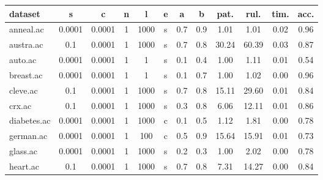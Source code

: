 \begin{table}[htbp]
	\centering
		\begin{tabular}{|l|c|c|c|c|c|c|c||c|c|c|c|}
		\hline
		\textbf{dataset}	& \textbf{s}	& \textbf{c}	& \textbf{n}	& \textbf{l}	& \textbf{e} & \textbf{a} & \textbf{b} & \textbf{pat.}	& \textbf{rul.}	& \textbf{tim.}	& \textbf{acc.}	\\
		\hline
		anneal.ac      & 0.0001   & 0.0001      & 1              & 1000                & s        & 0.7    & 0.9   & 1.01           & 1.01           & 0.02           & 0.96           \\
		\hline
		austra.ac      & 0.1      & 0.0001      & 1              & 1000                & s        & 0.7    & 0.8   & 30.24          & 60.39          & 0.03           & 0.87           \\
		\hline
		auto.ac        & 0.0001   & 0.0001      & 1              & 1                   & s        & 0.1    & 0.4   & 1.00           & 1.11           & 0.01           & 0.54           \\
		\hline
		breast.ac      & 0.0001   & 0.0001      & 1              & 1                   & s        & 0.1    & 0.7   & 1.00           & 1.02           & 0.00           & 0.96           \\
		\hline
		cleve.ac       & 0.1      & 0.0001      & 1              & 1000                & s        & 0.7    & 0.8   & 15.11          & 29.60          & 0.01           & 0.84           \\
		\hline
		crx.ac         & 0.1      & 0.0001      & 1              & 1000                & s        & 0.3    & 0.8   & 6.06           & 12.11          & 0.01           & 0.86           \\
		\hline
		diabetes.ac    & 0.0001   & 0.0001      & 1              & 1000                & c        & 0.1    & 0.5   & 1.12           & 1.81           & 0.00           & 0.78           \\
		\hline
		german.ac      & 0.0001   & 0.0001      & 1              & 100                 & c        & 0.5    & 0.9   & 15.64          & 15.91          & 0.01           & 0.73           \\
		\hline
		glass.ac       & 0.0001   & 0.0001      & 1              & 1000                & s        & 0.2    & 0.3   & 1.00           & 2.02           & 0.00           & 0.78           \\
		\hline
		heart.ac       & 0.1      & 0.0001      & 1              & 1000                & s        & 0.7    & 0.8   & 7.31           & 14.27          & 0.00           & 0.84           \\

\end{tabular}
\end{table}
